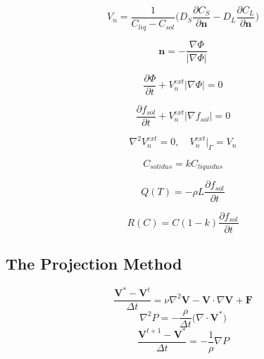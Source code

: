 \documentclass[12pt]{extarticle}
\begin{document}
\begin{equation} \label{interface_eq}
V_{n} = \frac{1}{C_{liq}-C_{sol}} \Bigg(D_{S} \frac{\partial C_{S}}{\partial \textbf{n}} - D_{L} \frac{\partial C_{L}}{\partial \textbf{n}} \Bigg)
\end{equation}

\begin{equation}
\textbf{n}  = -\frac{\nabla  \Phi}{\left| \nabla  \Phi \right|}
\end{equation}

\begin{equation}
\frac{\partial\Phi}{\partial t} + V_{n}^{ext}|\nabla \Phi| = 0 
\label{sharpphasefield}
\end{equation}

\begin{equation}
\frac{\partial f_{sol}}{\partial t} + V_{n}^{ext}|\nabla f_{sol}| = 0 
\label{sharpphasefield}
\end{equation}

\begin{equation}
\nabla^{2} V_{n}^{ext} = 0 ,\quad V_{n}^{ext} |_{\Gamma} = V_{n}
\label{sharpphasefield}
\end{equation}

\begin{equation}
C_{solidus} = k C_{liquidus}
\end{equation}

\begin{equation}
Q(T) = - \rho L \frac{\partial f_{sol}}{\partial t}
\end{equation}

\begin{equation}
R(C) = C(1-k)\frac{\partial f_{sol}}{\partial t}
\end{equation}

\subsection*{The Projection Method}
\begin{equation}
\frac{\textbf{V}^{*}-\textbf{V}^{t}}{\Delta t} = \nu \nabla^{2} \textbf{V} - \textbf{V} \cdot \nabla \textbf{V} + \textbf{F}
\end{equation}
\begin{equation}
\nabla^{2} P = -\frac{\rho}{\Delta t} \Big( \nabla \cdot \textbf{V}^{*} \Big)
\end{equation}
\begin{equation}
\frac{\textbf{V}^{t+1}-\textbf{V}^{*}}{\Delta t} = -\frac{1}{\rho} \nabla P
\end{equation}
\end{document}
